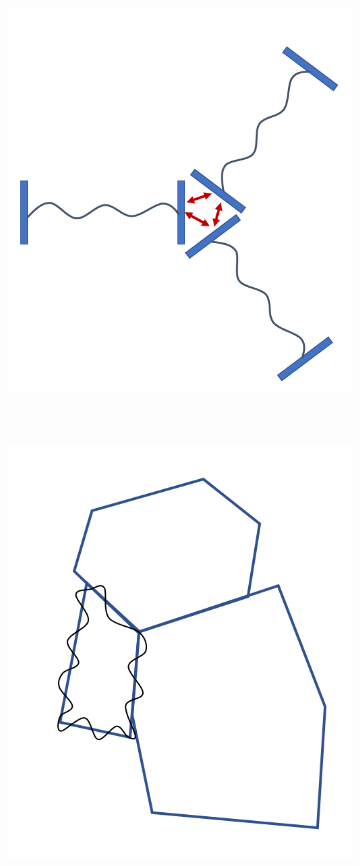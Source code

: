 \begin{figure}[h]
    \centering
    \begin{subfigure}[b]{0.3\textwidth}
        \includegraphics[width=\textwidth]{ch2/fig2/coupled_FP.png}
        \caption{}
    \end{subfigure}
~\quad\quad
    \begin{subfigure}[b]{0.3\textwidth}
        \includegraphics[width=\textwidth]{ch2/fig2/coupled_rings.png}

\end{subfigure}
\end{figure}
